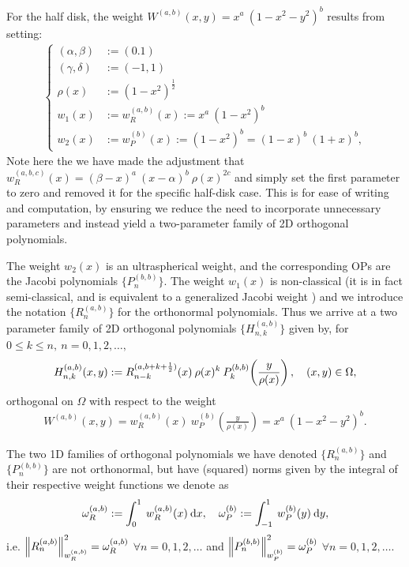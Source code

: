 \documentclass[11pt, oneside]{article}   	%
\newcommand{\half}{\frac{1}{2}}
\newcommand{\hdop}{H}
\newcommand{\hdopnk}{\hdop_{n,k}}
\newcommand{\hdopnkab}{\hdop_{n,k}^{(a,b)}}
\newcommand{\genjac}{R}
\newcommand{\genjacnmk}{\genjac_{n-k}}
\newcommand{\genjacw}{w_\genjac}
\newcommand{\normgenjac}{\omega_\genjac}
\newcommand{\normjac}{\omega_P}
\begin{document}
For the half disk, the weight $W^{(a,b)}(x,y) = x^a \: (1-x^2-y^2)^b$ results from setting:
\begin{align*}
\begin{cases}
(\alpha,\beta) &:= (0.1) \\
(\gamma,\delta) &:= (-1,1) \\
\rho(x) &:= (1-x^2)^{\half} \\
w_1(x) &:= \genjacw^{(a,b)}(x) := x^a \: (1-x^2)^b \\
w_2(x) &:= w_P^{(b)}(x) := (1-x^2)^b = (1-x)^b \: (1+x)^b,
\end{cases}
\end{align*}
Note here the we have made the adjustment that $\genjacw^{(a,b,c)}(x) = (\beta - x)^a \: (x - \alpha)^{b} \: \rho(x)^{2c}$ and simply set the first parameter to zero and removed it for the specific half-disk case. This is for ease of writing and computation, by ensuring we reduce the need to incorporate unnecessary parameters and instead yield a two-parameter family of 2D orthogonal polynomials. 

The weight $w_2(x)$ is an ultraspherical weight, and the corresponding OPs are   the Jacobi polynomials  \(\{P_n^{(b, b)}\}\). The weight $w_1(x)$ is non-classical (it is in fact semi-classical, and is equivalent to a generalized Jacobi weight \cite[\S5]{magnus1995painleve}) and we introduce the notation \(\{\genjac_n^{(a, b)}\}\) for the orthonormal polynomials. Thus we arrive at  a two parameter family of 2D orthogonal polynomials $\{\hdopnkab\}$ given by, for $0 \le k \le n, \: n = 0,1,2,\dots,$
\begin{align}\label{eq:diskpolys}
 \hdopnk^{(a,b)}(x,y) := \genjacnmk^{(a, b+k+\half)}(x) \: \rho(x)^k \: P_k^{(b,b)}\fpr(\frac{y}{\rho(x)}), \quad (x,y) \in \Omega, 
\end{align}
orthogonal on \(\Omega\) with respect to the weight
\begin{align*}
W^{(a,b)}(x,y) = \genjacw^{(a,b)}(x) \: w_P^{(b)}(\frac{y}{\rho(x)}) = x^a \: (1-x^2-y^2)^b.
\end{align*}

The two 1D families of orthogonal polynomials we have denoted $\{\genjac_{n}^{(a,b)}\}$ and $\{P_n^{(b,b)}\}$ are not orthonormal, but have (squared) norms given by the integral of their respective weight functions we denote as
\begin{align*}
	\normgenjac^{(a,b)} := \int_0^1 \: \genjacw^{(a,b)}(x) \: \D x, \quad \normjac^{(b)} := \int_{-1}^1 \: w_P^{(b)}(y) \: \D y,
\end{align*}
i.e. $\norm{\genjac_{n}^{(a,b)}}_{\genjacw^{(a,b)}}^2 = \normgenjac^{(a,b)}$ $\forall n = 0,1,2,\dots$ and $\norm{P_{n}^{(b,b)}}_{w_P^{(b)}}^2 = \normjac^{(b)}$ $\forall n = 0,1,2,\dots$.
\end{document}
